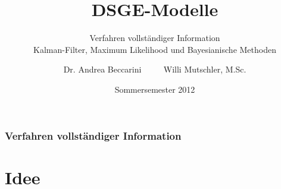 \documentclass{beamer} %
\begin{document}
\author[Willi Mutschler]{Dr. Andrea Beccarini $\qquad$ Willi Mutschler, M.Sc.}
\date{Sommersemester 2012}
\title{DSGE-Modelle}
\subtitle{Verfahren vollst\"{a}ndiger Information\\Kalman-Filter, Maximum Likelihood und Bayesianische Methoden}

\begin{frame}
\titlepage
\end{frame}

\begin{frame}\frametitle{Verfahren vollst\"{a}ndiger Information}
\tableofcontents
\end{frame}

\section{Idee}
\end{document}
